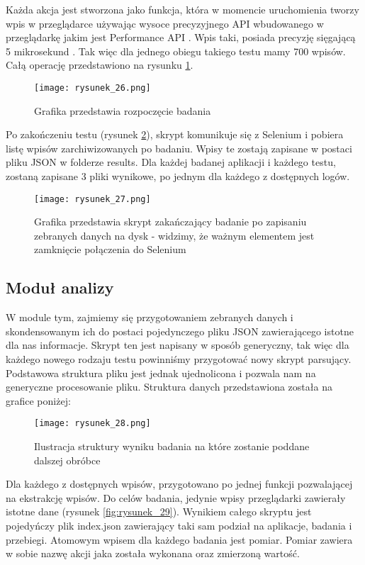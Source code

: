 Każda akcja jest stworzona jako funkcja, która w momencie uruchomienia tworzy wpis w przeglądarce używając wysoce precyzyjnego API wbudowanego
w przeglądarkę jakim jest Performance API \cite{mozilla-perf}. Wpis taki, posiada precyzję sięgającą 5 mikrosekund \cite{mozilla-high-res-api}.
Tak więc dla jednego obiegu takiego testu mamy 700 wpisów. Całą operację przedstawiono na rysunku \ref{fig:rysunek_26}.

\begin{figure}[!ht]
    \centering
    \texttt{[image: rysunek\_26.png]}
    \caption{Grafika przedstawia rozpoczęcie badania}
    \label{fig:rysunek_26}
\end{figure}

Po zakończeniu testu (rysunek \ref{fig:rysunek_27}), skrypt komunikuje się z Selenium i pobiera listę wpisów zarchiwizowanych po badaniu.
Wpisy te zostają zapisane w postaci pliku JSON w folderze results.
Dla każdej badanej aplikacji i każdego testu, zostaną zapisane 3 pliki wynikowe, po jednym dla każdego z dostępnych logów.

\begin{figure}[!ht]
    \centering
    \texttt{[image: rysunek\_27.png]}
    \caption{Grafika przedstawia skrypt zakańczający badanie po zapisaniu zebranych danych na dysk - widzimy, że ważnym elementem jest zamknięcie połączenia do Selenium}
    \label{fig:rysunek_27}
\end{figure}

\subsection{Moduł analizy}

W module tym, zajmiemy się przygotowaniem zebranych danych i skondensowanym ich do postaci pojedynczego pliku JSON zawierającego istotne dla nas informacje.
Skrypt ten jest napisany w sposób generyczny, tak więc dla każdego nowego rodzaju testu powinniśmy przygotować nowy skrypt parsujący.
Podstawowa struktura pliku jest jednak ujednolicona i pozwala nam na generyczne procesowanie pliku. Struktura danych przedstawiona została na grafice poniżej:

\begin{figure}[!ht]
    \centering
    \texttt{[image: rysunek\_28.png]}
    \caption{Ilustracja struktury wyniku badania na które zostanie poddane dalszej obróbce}
    \label{fig:rysunek_28}
\end{figure}

Dla każdego z dostępnych wpisów, przygotowano po jednej funkcji pozwalającej na ekstrakcję wpisów.
Do celów badania, jedynie wpisy przeglądarki zawierały istotne dane (rysunek \ref{fig:rysunek_29}).
Wynikiem całego skryptu jest pojedyńczy plik index.json zawierający taki sam podział na aplikacje, badania i przebiegi.
Atomowym wpisem dla każdego badania jest pomiar. Pomiar zawiera w sobie nazwę akcji jaka została wykonana oraz zmierzoną wartość.

